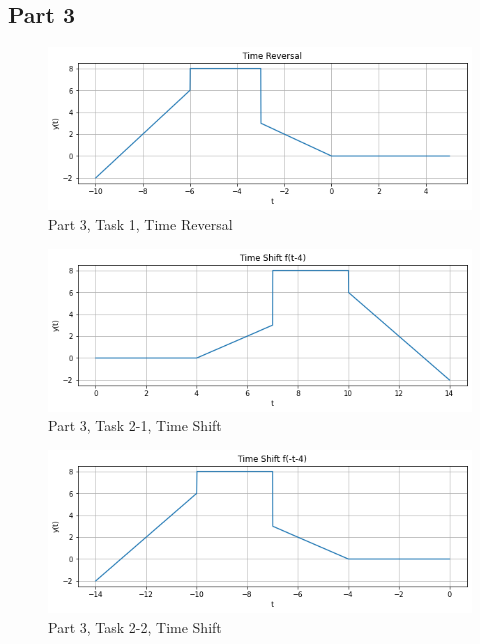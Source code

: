 \documentclass[12pt]{report}
\begin{document}
\subsection{Part 3} {
\begin{figure}[h!]
\begin{center}
\caption{Part 3, Task 1, Time Reversal}
\includegraphics[scale=0.65]{Task1.png}
\end{center}
\end{figure}

\begin{figure}[h!]
\begin{center}
\caption{Part 3, Task 2-1, Time Shift}
\includegraphics[scale=0.65]{Task2_1.png}
\end{center}
\end{figure}

\begin{figure}[h!]
\begin{center}
\caption{Part 3, Task 2-2, Time Shift}
\includegraphics[scale=0.65]{Task2_2.png}
\end{center}
\end{figure}

}
\end{document}
